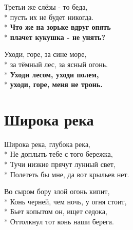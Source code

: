 \medskip

\begin{minipage}{\linewidth}
Третьи же слёзы - то беда,\\*
пусть их не будет никогда.\\*
\textbf{Что же на зорьке вдруг опять}\\*
\textbf{плачет кукушка - не унять?}\\
\end{minipage}\par\medskip\nobreak

\medskip

\begin{minipage}{\linewidth}
\hspace*{1.5em}Уходи, горе, за сине море,\\*
\hspace*{1.5em}за тёмный лес, за ясный огонь.\\*
\hspace*{1.5em}\textbf{Уходи лесом, уходи полем,}\\*
\hspace*{1.5em}\textbf{уходи, горе, меня не тронь.}\\
\end{minipage}

\vspace{\fill}\newpage

\section{Широка река}
\label{song:Широка_река}

\medskip

\begin{minipage}{\linewidth}
Широка река, глубока река,\\*
Не доплыть тебе с того бережка,\\*
Тучи низкие прячут лунный свет,\\*
Полететь бы мне, да вот крыльев нет.\\
\end{minipage}\par\medskip\nobreak

\medskip

\begin{minipage}{\linewidth}
Во сыром бору злой огонь кипит,\\*
Конь черней, чем ночь, у огня стоит,\\*
Бьет копытом он, ищет седока,\\*
Оттолкнул тот конь наши берега.\\
\end{minipage}\par\medskip\nobreak

